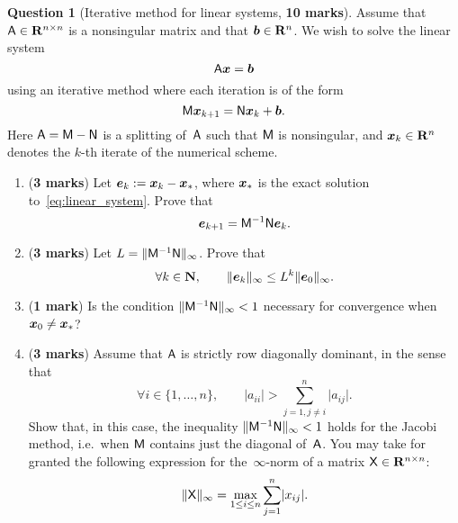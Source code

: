 \documentclass[11pt]{article}
\theoremstyle{definition}
\newtheorem{question}{Question}
\begin{document}
\newpage
\begin{question}
    [Iterative method for linear systems, \textbf{10 marks}]
    Assume that $\mathsf A \in \mathbf R^{n \times n}$ is a nonsingular matrix and that $\mathbf{\boldsymbol{b}} \in \mathbf R^n$.
    We wish to solve the linear system
    \begin{equation}
        \label{eq:linear_system}
        \mathsf A \mathbf{\boldsymbol{x}} = \mathbf{\boldsymbol{b}}
    \end{equation}
    using an iterative method where each iteration is of the form
    \[
        \mathsf M \mathbf{\boldsymbol{x}}_{k+1} = \mathsf N \mathbf{\boldsymbol{x}}_k + \mathbf{\boldsymbol{b}}.
    \]
    Here $\mathsf A = \mathsf M - \mathsf N$ is a splitting of~$\mathsf A$ such that $\mathsf M$ is nonsingular,
    and $\mathbf{\boldsymbol{x}}_k \in \mathbf R^n$ denotes the $k$-th iterate of the numerical scheme.

    \begin{enumerate}
        \item
            (\textbf{3 marks})
            Let $\mathbf{\boldsymbol{e}}_k := \mathbf{\boldsymbol{x}}_k - \mathbf{\boldsymbol{x}}_*$,
            where $\mathbf{\boldsymbol{x}}_*$ is the exact solution to~\eqref{eq:linear_system}.
            Prove that
            \[
                \mathbf{\boldsymbol{e}}_{k+1} = \mathsf M^{-1} \mathsf N \mathbf{\boldsymbol{e}}_k.
            \]

        \item
            (\textbf{3 marks})
            Let $L = \lVert\mathsf M^{-1} \mathsf N\rVert_{\infty}$.
            Prove that
            \[
                \forall k \in \mathbf N, \qquad
                \lVert\mathbf{\boldsymbol{e}}_k\rVert_{\infty} \leq L^k \lVert\mathbf{\boldsymbol{e}}_0\rVert_{\infty}.
            \]

        \item
            (\textbf{1 mark})
            Is the condition $\lVert\mathsf M^{-1} \mathsf N\rVert_{\infty} < 1$ necessary
            for convergence when $\mathbf{\boldsymbol{x}}_0 \neq \mathbf{\boldsymbol{x}}_*$?

        \item
            (\textbf{3 marks})
            Assume that $\mathsf A$ is strictly row diagonally dominant, in the sense that
            \[
                \forall i \in \{1, \dotsc, n\}, \qquad
                \lvert a_{ii} \rvert > \sum_{j=1, j\neq i}^{n} \lvert a_{ij} \rvert.
            \]
            Show that, in this case, the inequality $\lVert\mathsf M^{-1} \mathsf N\rVert_{\infty} < 1$ holds for the Jacobi method,
            i.e.\ when $\mathsf M$ contains just the diagonal of~$\mathsf A$.
            You may take for granted the following expression for the~$\infty$-norm of a matrix $\mathsf X \in \mathbf R^{n \times n}$:
            \[
                \lVert\mathsf X\rVert_{\infty} = \max_{1 \leq i \leq n} \sum_{j=1}^{n} \lvert x_{ij}\rvert.
            \]


\end{enumerate}
\end{question}
\end{document}
